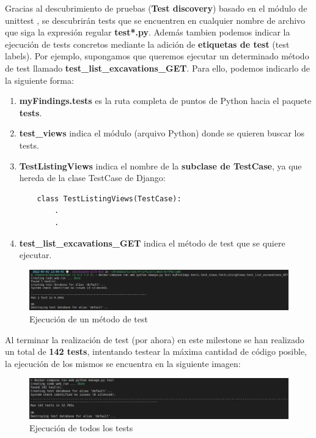 Gracias al descubrimiento de pruebas (\textbf{Test discovery}) basado en el módulo de
unittest \cite{test-discovery}, se descubrirán tests que se encuentren en cualquier nombre
de archivo que siga la expresión regular \textbf{test*.py}. Además tambien podemos indicar
la ejecución de tests concretos mediante la adición de \textbf{etiquetas de test} (test
labels). Por ejemplo, supongamos que queremos ejecutar un determinado método de test
llamado \textbf{test\_list\_excavations\_GET}. Para ello, podemos indicarlo de la siguiente
forma:

    \begin{enumerate}
        \item \textbf{myFindings.tests} es la ruta completa de puntos de Python hacia el
        paquete \textbf{tests}.
        \item \textbf{test\_views} indica el módulo (arquivo Python) donde se quieren
        buscar los tests.
        \item \textbf{TestListingViews} indica el nombre de la \textbf{subclase de TestCase},
        ya que hereda de la clase TestCase de Django:
    \begin{verbatim}
    class TestListingViews(TestCase):
        .
        .
    \end{verbatim}
        \item \textbf{test\_list\_excavations\_GET} indica el método de test que se quiere
        ejecutar.
    \end{enumerate}

    \begin{figure}[H]
        \centering
        \includegraphics[scale=0.27]{imagenes/one-test.png}
        \caption{Ejecución de un método de test}
        \label{fig:one-test}
    \end{figure}

Al terminar la realización de test (por ahora) en este milestone se han realizado un total de
\textbf{142 tests}, intentando testear la máxima cantidad de código posible, la ejecución de
los mismos se encuentra en la siguiente imagen:

    \begin{figure}[H]
        \centering
        \includegraphics[scale=0.30]{imagenes/all-tests.png}
        \caption{Ejecución de todos los tests}
        \label{fig:all-tests}
    \end{figure}

